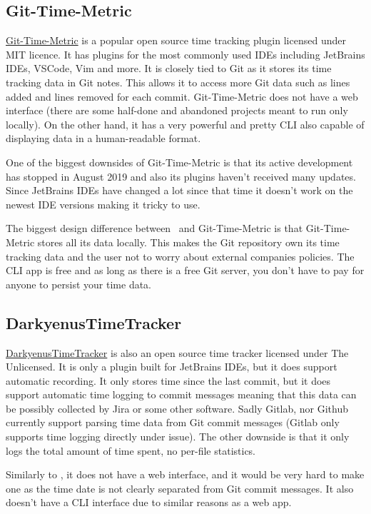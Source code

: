 \subsection{Git-Time-Metric}\label{subsec:git-time-metric}
\href{https://github.com/git-time-metric/gtm}{Git-Time-Metric} is a popular open source time tracking plugin licensed under MIT licence.
It has plugins for the most commonly used IDEs including JetBrains IDEs, VSCode, Vim and more.
It is closely tied to Git as it stores its time tracking data in Git notes.
This allows it to access more Git data such as lines added and lines removed for each commit.
Git-Time-Metric does not have a web interface (there are some half-done and abandoned projects meant to run only locally).
On the other hand, it has a very powerful and pretty CLI also capable of displaying data in a human-readable format.

One of the biggest downsides of Git-Time-Metric is that its active development has stopped in August 2019 and also its plugins haven't received many updates.
Since JetBrains IDEs have changed a lot since that time it doesn't work on the newest IDE versions making it tricky to use.

The biggest design difference between~ and Git-Time-Metric is that Git-Time-Metric stores all its data locally.
This makes the Git repository own its time tracking data and the user not to worry about external companies policies.
The CLI app is free and as long as there is a free Git server, you don't have to pay for anyone to persist your time data.


\subsection{DarkyenusTimeTracker}\label{subsec:darkyenus-time-tracker}
\href{https://github.com/Darkyenus/DarkyenusTimeTracker}{DarkyenusTimeTracker} is also an open source time tracker licensed under The Unlicensed.
It is only a plugin built for JetBrains IDEs, but it does support automatic recording.
It only stores time since the last commit, but it does support automatic time logging to commit messages meaning that this data can be possibly collected by Jira or some other software.
Sadly Gitlab, nor Github currently support parsing time data from Git commit messages (Gitlab only supports time logging directly under issue).
The other downside is that it only logs the total amount of time spent, no per-file statistics.

Similarly to
, it does not have a web interface, and it would be very hard to make one as the time date is not clearly separated from Git commit messages.
It also doesn't have a CLI interface due to similar reasons as a web app.


